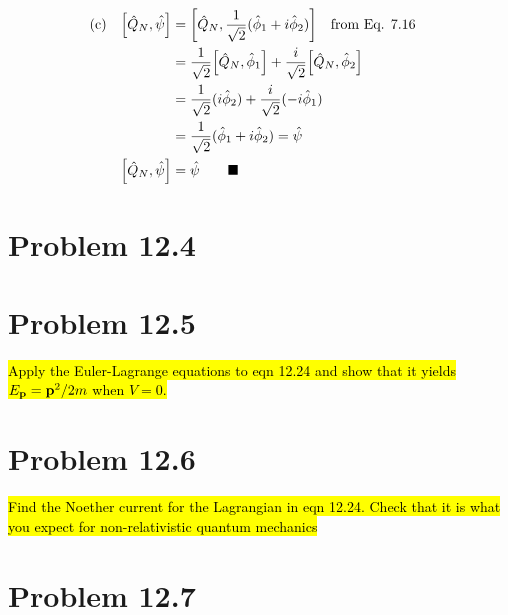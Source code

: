 \documentclass{article}
\begin{document}
\begin{align*}
    \qq*{(c)}\bqty{\hat{Q}_N,\hat{\psi}} & =\bqty{\hat{Q}_N,\frac{1}{\sqrt{2}}(\hat{\phi}_1+i\hat{\phi}_2)}\qq{from Eq. 7.16}                   \\
                                         & =\frac{1}{\sqrt{2}}\bqty{\hat{Q}_N,\hat{\phi}_1}+    \frac{i}{\sqrt{2}}\bqty{\hat{Q}_N,\hat{\phi}_2} \\
                                         & =\frac{1}{\sqrt{2}}(i\hat{\phi}_2)+\frac{i}{\sqrt{2}}(-i\hat{\phi}_1)                                \\
                                         & =\frac{1}{\sqrt{2}}(\hat{\phi}_1+i\hat{\phi}_2)=\hat{\psi}                                           \\
    \bqty{\hat{Q}_N,\hat{\psi}}          & =\hat{\psi}\qquad\blacksquare                                                                        \\
\end{align*}


\section*{Problem 12.4}


\section*{Problem 12.5}
\begin{quoting}
    \hl{Apply the Euler-Lagrange equations to eqn 12.24 and show that it yields $E_{\vb{p}}=\vb{p}^2 /2m$ when $V=0$.}
\end{quoting}


\section*{Problem 12.6}
\begin{quoting}
    \hl{Find the Noether current for the Lagrangian in eqn 12.24. Check that it is what you expect for non-relativistic quantum mechanics}
\end{quoting}


\section*{Problem 12.7}
\end{document}
